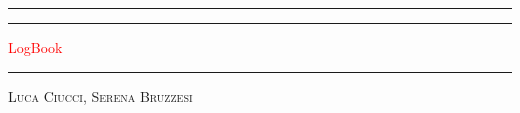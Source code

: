 


\begin{titlepage} %
	
	\centering %
	
	
	\rule{\textwidth}{1pt} %
	
	\vspace{2pt}\vspace{-\baselineskip} %
	
	\rule{\textwidth}{0.4pt} %
	
	\vspace{0.1\textheight} %
	
	
	\textcolor{red}{ %
		{\Huge LogBook}\\[0.5\baselineskip] %
	}
	
	\vspace{0.025\textheight} %
	
	\rule{0.3\textwidth}{0.4pt} %
	
	\vspace{0.1\textheight} %
	
	
	{\Large \textsc{Luca Ciucci, Serena Bruzzesi}} %
	
	\vfill %
	
	
	

\end{titlepage}
